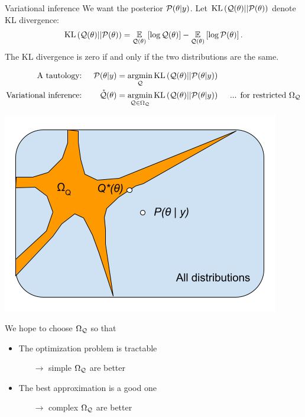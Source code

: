 \documentclass[8pt]{beamer}\usepackage[]{graphicx}\usepackage[]{color}
\begin{document}

\begin{frame}[t]{Variational inference \citep{blei:2016:variational}}
%
We want the posterior $\mathcal{P}(\theta \vert y)$.  Let $\mathrm{KL}\left(\mathcal{Q}(\theta) || \mathcal{P}(\theta)\right)$ denote KL divergence:
%
\begin{align*}
    \mathrm{KL}\left(\mathcal{Q}(\theta) || \mathcal{P}(\theta)\right) = \underset{\mathcal{Q}(\theta)}{\mathbb{E}}\left[\log \mathcal{Q}(\theta)\right] - \underset{\mathcal{Q}(\theta)}{\mathbb{E}}\left[\log \mathcal{P}(\theta)\right].
\end{align*}
%
The KL divergence is zero if and only if the two distributions are the same.

\pause

%
\begin{align*}
%
\textrm{A tautology: }&& \post &= \argmin_{\q} \kl{\q(\theta)}{\post} \\
\textrm{Variational inference: }&& \qstar(\theta) &= \argmin_{\q \in \qdom} \kl{\q(\theta)}{\post}
\quad\textrm{ ... for restricted }\qdom\\
%
\end{align*}
%
\pause
%
\begin{minipage}{0.4\textwidth}
    \includegraphics[width=\textwidth]{static_figures/VB}
\end{minipage}
\begin{minipage}{0.55\textwidth}
We hope to choose $\Omega_{\mathcal{Q}}$ so that
%
\begin{itemize}
\item The optimization problem is tractable
%
\begin{itemize}
\item[$\rightarrow$] simple $\Omega_{\mathcal{Q}}$ are better
\end{itemize}
%
\item The best approximation is a good one
\begin{itemize}
    \item[$\rightarrow$] complex $\Omega_{\mathcal{Q}}$ are better
\end{itemize}    
\end{itemize}


\end{minipage}
\end{frame}
\end{document}

